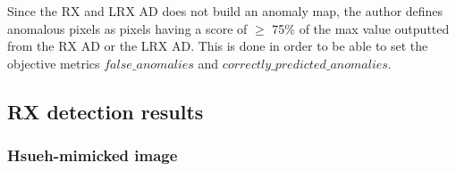 Since the RX and LRX AD does not build an anomaly map, the author defines anomalous pixels as pixels having a score of $\geqslant$ 75\% of the max value outputted from the RX AD or the LRX AD. This is done in order to be able to set the objective metrics $false\_anomalies$ and $correctly\_predicted\_anomalies$.

\subsection{RX detection results}
 

\subsubsection{Hsueh-mimicked image}

\begin{figure}[H]
\begin{minipage}[]{.5\linewidth}
\centering
{}
\end{minipage}%
\begin{minipage}[]{.5\linewidth}
\centering

\end{minipage}
\end{figure}
